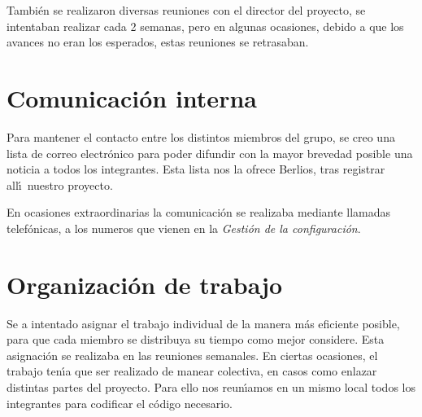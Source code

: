 Tambi\'en se realizaron diversas reuniones con el director del proyecto, se intentaban realizar cada 2 semanas, pero en algunas ocasiones, debido a que los avances no eran los esperados, estas reuniones se retrasaban.

\section{Comunicaci\'on interna}

Para mantener el contacto entre los distintos miembros del grupo, se creo una lista de correo electr\'onico para poder difundir con la mayor brevedad posible una noticia a todos los integrantes. Esta lista nos la ofrece Berlios, tras registrar all\'\i ~nuestro proyecto.

En ocasiones extraordinarias la comunicaci\'on se realizaba mediante llamadas telef\'onicas, a los numeros que vienen en la \emph{Gesti\'on de la configuraci\'on}.

\section{Organizaci\'on de trabajo}

Se a intentado asignar el trabajo individual de la manera m\'as eficiente posible, para que cada miembro se distribuya su tiempo como mejor considere. Esta asignaci\'on se realizaba en las reuniones semanales.
En ciertas ocasiones, el trabajo ten\'\i a que ser realizado de manear colectiva, en casos como enlazar distintas partes del proyecto. Para ello nos reun\'\i amos en un mismo local todos los integrantes para codificar el c\'odigo necesario.
